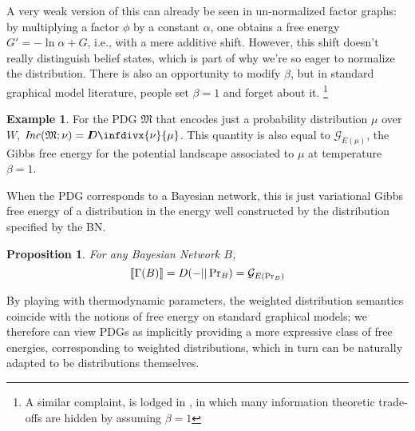 \documentclass{article}
\theoremstyle{plain}
\newtheorem{prop}[theorem]{Proposition}
\theoremstyle{definition}
\newtheorem{examplex}{Example}
\theoremstyle{remark}
\newcommand{\thickD}{I\mkern-8muD}
\newcommand{\kldiv}{\thickD\infdivx}%
\DeclarePairedDelimiter{\bbr}{\llbracket}{\rrbracket}
\newcommand{\dg}[1]{\mathfrak{#1}}
\newcommand\inco{\mathit{Inc}}
\newcommand\PDGof{\Gamma}
\numberwithin{equation}{section}
\begin{document}
	A very weak version of this can already be seen in un-normalized factor graphs: by multiplying a factor $\phi$ by a constant $\alpha$, one obtains a free energy $G' = - \ln \alpha + G$, i.e., with a mere additive shift. However, this shift doesn't really distinguish belief states, which is part of why we're so eager to normalize the distribution.
	There is also an opportunity to modify $\beta$, but in standard graphical model literature, people set $\beta = 1$ and forget about it.%
		\footnote{A similar complaint, is lodged in \cite{fixing-broken-elbo}, in which many information theoretic trade-offs are hidden by assuming $\beta = 1$}


	\begin{examplex}%
		\label{ex:energy-from-distrib}
		For the PDG $\dg M$ that encodes just a probability distribution $\mu$ over $W$,  $\inco(\dg M; \nu) = \kldiv{\nu}{\mu}$. This quantity is also equal to $\mathcal G_{E(\mu)}$, the Gibbs free energy for the potential landscape associated to $\mu$ at temperature $\beta = 1$.
	\end{examplex}


	When the PDG corresponds to a Bayesian network, this is just variational Gibbs free energy of a distribution in the energy well constructed by the distribution specified by the BN.

	\begin{prop}\label{prop:bn-free-energy}
		For any Bayesian Network $B$, 
		\[ \bbr{\PDGof(B)} = D(- || \Pr\nolimits_B) = \mathcal G_{E(\Pr_B)} \]
	\end{prop}
	
	By playing with thermodynamic parameters, the weighted distribution semantics coincide with the notions of free energy on standard graphical models; we therefore can view PDGs as implicitly providing a more expressive class of free energies, corresponding to weighted distributions, which in turn can be naturally adapted to be distributions themselves.
	
\end{document}
